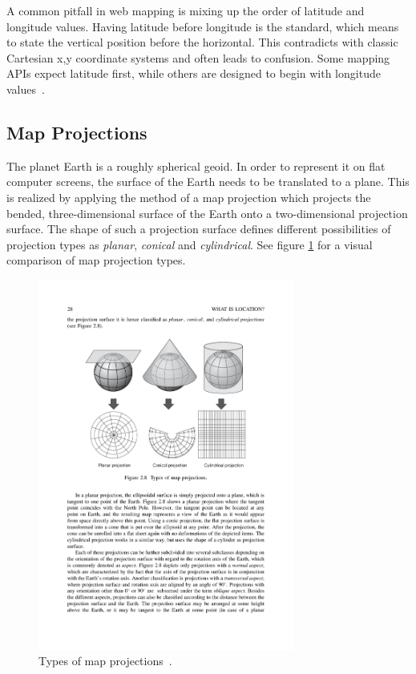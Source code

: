 \begin{itemize}
A common pitfall in web mapping is mixing up the order of latitude and longitude values. Having latitude before longitude is the standard, which means to state the vertical position before the horizontal. This contradicts with classic Cartesian x,y coordinate systems and often leads to confusion. Some mapping APIs expect latitude first, while others are designed to begin with longitude values~\cite{Kupper2005lbs, Zzolo11mappingdrupal}. 

\end{itemize}




\subsection{Map Projections}

The planet Earth is a roughly spherical geoid. In order to represent it on flat computer screens, the surface of the Earth needs to be translated to a plane. This is realized by applying the method of a map projection which projects the bended, three-dimensional surface of the Earth onto a two-dimensional projection surface. The shape of such a projection surface defines different possibilities of projection types as \textit{planar}, \textit{conical} and \textit{cylindrical}. See figure \ref{fig:map-projection-types} for a visual comparison of map projection types.

\begin{figure}[h]
  \begin{center}
    \includegraphics[width=0.75\textwidth]{figures/map_projection_types}
    \caption{Types of map projections~\cite[p 28]{Kupper2005lbs}.}
    \label{fig:map-projection-types}
  \end{center}
\end{figure}

